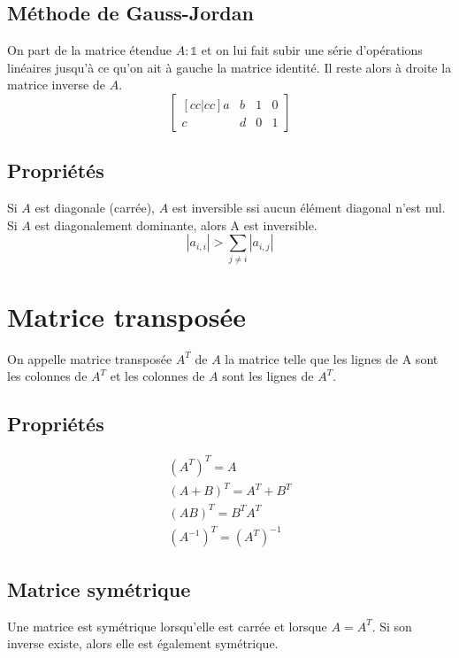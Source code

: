 \documentclass[a4paper]{book}
\begin{document}
\subsection{Méthode de Gauss-Jordan}
On part de la matrice étendue $A:\mathbb{1}$ et on lui fait subir une série d'opérations linéaires jusqu'à ce qu'on ait à gauche la matrice identité. Il reste alors à droite la matrice inverse de $A$.
\begin{equation}
    \begin{bmatrix}[cc|cc]
        a&b&1&0 \\
        c&d&0&1
    \end{bmatrix}
\end{equation}
\subsection{Propriétés}
Si $A$ est diagonale (carrée), $A$ est inversible ssi aucun élément diagonal n'est nul.
\newline \indent Si $A$ est diagonalement dominante, alors A est inversible.
\begin{equation}
    |a_{i,i}| > \sum_{j\ne i}|a_{i,j}|
\end{equation}
\section{Matrice transposée}
On appelle matrice transposée $A^T$ de $A$ la matrice telle que les lignes de A sont les colonnes de $A^T$ et les colonnes de $A$ sont les lignes de $A^T$.
\subsection{Propriétés}
\begin{gather}
    (A^T)^T = A \\
    (A + B)^T = A^T + B^T \\
    (AB)^T = B^TA^T \\
    (A^{-1})^T = (A^T)^{-1} 
\end{gather}
\subsection{Matrice symétrique}
Une matrice est symétrique lorsqu'elle est carrée et lorsque $A=A^T$. Si son inverse existe, alors elle est également symétrique.
\end{document}

